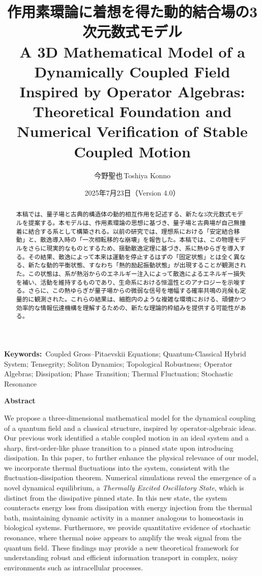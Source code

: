 \documentclass[a4paper,11pt,ja=standard,lualatex]{bxjsarticle}
\title{作用素環論に着想を得た動的結合場の3次元数式モデル\\
\large A 3D Mathematical Model of a Dynamically Coupled Field Inspired by Operator Algebras: Theoretical Foundation and Numerical Verification of Stable Coupled Motion}
\author[1]{今野聖也\,Toshiya Konno}
\affil[1]{Independent Researcher\\\href{mailto:ktlifeisonlyreallyoverafter60@gmail.com}{ktlifeisonlyreallyoverafter60@gmail.com}}
\date{2025年7月23日（Version 4.0）}
\begin{document}
\maketitle

\noindent\textbf{Keywords:}\ Coupled Gross–Pitaevskii Equations; Quantum-Classical Hybrid System; Tensegrity; Soliton Dynamics; Topological Robustness; Operator Algebras; Dissipation; Phase Transition; Thermal Fluctuation; Stochastic Resonance

\begin{abstract}
\noindent 本稿では、量子場と古典的構造体の動的相互作用を記述する、新たな3次元数式モデルを提案する。本モデルは、作用素環論の思想に基づき、量子場と古典場が自己無撞着に結合する系として構築される。以前の研究では、理想系における「安定結合移動」と、散逸導入時の「一次相転移的な崩壊」を報告した。本稿では、この物理モデルをさらに現実的なものとするため、揺動散逸定理に基づき、系に熱ゆらぎを導入する。その結果、散逸によって本来は運動を停止するはずの「固定状態」とは全く異なる、新たな動的平衡状態、すなわち「熱的励起振動状態」が出現することが観測された。この状態は、系が熱浴からのエネルギー注入によって散逸によるエネルギー損失を補い、活動を維持するものであり、生命系における恒温性とのアナロジーを示唆する。さらに、この熱ゆらぎが量子場からの微弱な信号を増幅する確率共鳴の兆候も定量的に観測された。これらの結果は、細胞内のような複雑な環境における、頑健かつ効率的な情報伝達機構を理解するための、新たな理論的枠組みを提供する可能性がある。
\end{abstract}

\vspace{1em}
\noindent\textbf{Abstract}
\par\noindent
\small
We propose a three-dimensional mathematical model for the dynamical coupling of a quantum field and a classical structure, inspired by operator-algebraic ideas. Our previous work identified a stable coupled motion in an ideal system and a sharp, first-order-like phase transition to a pinned state upon introducing dissipation. In this paper, to further enhance the physical relevance of our model, we incorporate thermal fluctuations into the system, consistent with the fluctuation-dissipation theorem. Numerical simulations reveal the emergence of a novel dynamical equilibrium, a \emph{Thermally Excited Oscillatory State}, which is distinct from the dissipative pinned state. In this new state, the system counteracts energy loss from dissipation with energy injection from the thermal bath, maintaining dynamic activity in a manner analogous to homeostasis in biological systems. Furthermore, we provide quantitative evidence of stochastic resonance, where thermal noise appears to amplify the weak signal from the quantum field. These findings may provide a new theoretical framework for understanding robust and efficient information transport in complex, noisy environments such as intracellular processes.
\vspace{2em}
\end{document}
